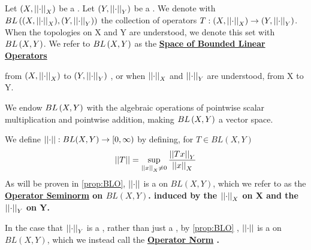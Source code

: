 \label{def:BLO} 
\newcommand{\SpaceOfBoundedLinearOperators}[0]{ 
    \bf \hyperref[def:BLO]{Space of Bounded Linear Operators} \rm
}
\newcommand{\OperatorSeminorm}[0]{
    \bf \hyperref[def:BLO]{Operator Seminorm} \rm
}
\newcommand{\OperatorNorm}[0]{
    \bf \hyperref[def:BLO]{Operator Norm} \rm
}
\begin{df}
Let $(X,\left|\left| \cdot \right|\right|_X)$ be a \NonDegenerate \SeminormedSpace.
Let $(Y, \left|\left| \cdot \right|\right|_Y)$ be a \SeminormedSpace.
We denote with $BL\left( (X,\left|\left| \cdot \right|\right|_X), (Y, \left|\left| \cdot \right|\right|_Y)\right)$ 
the collection of
\Continuous
\Linear
operators
$T:(X, \left|\left| \cdot \right|\right|_X) \to (Y, \left|\left| \cdot \right|\right|_Y)$. 
When the topologies on X and Y are understood, we denote this set with
$BL\left( X,Y\right)$. 
We refer to $BL\left( X,Y\right)$ as the \SpaceOfBoundedLinearOperators 
from $(X, \left|\left| \cdot \right|\right|_X)$ to $(Y, \left|\left| \cdot \right|\right|_Y)$ 
, or when $\left|\left| \cdot \right|\right|_X$ and $\left|\left| \cdot \right|\right|_Y$ are understood, 
from X to Y. 

We endow $BL\left( X,Y\right)$ with the algebraic operations
of pointwise scalar multiplication
and pointwise addition, making $BL\left( X,Y\right)$ a vector space. 

We define $\left|\left| \cdot \right|\right|:BL(X,Y) \to [0,\infty)$ by defining, 
for $T \in BL(X,Y)$
\begin{equation}
    \left|\left| T \right|\right| = \sup\limits_{\left|\left| x \right|\right|_X \neq 0} \frac{\left|\left| Tx \right|\right|_Y}{\left|\left| x \right|\right|_X}
\end{equation}
As will be proven in \ref{prop:BLO}, $\left|\left| \cdot \right|\right|$ is a \Seminorm on $BL(X,Y)$, which 
we refer to as the \OperatorSeminorm on $BL(X,Y)$. induced by the
\Seminorm $\left|\left| \cdot \right|\right|_X$ on X and the \Seminorm $\left|\left| \cdot \right|\right|_Y$ on Y. 

In the case that $\left|\left| \cdot \right|\right|_{Y}$ is a \Norm, rather than just a \Seminorm, by \ref{prop:BLO}
, $\left|\left| \cdot \right|\right|$ is a \Norm on $BL(X,Y)$, which we instead call the \OperatorNorm. 
\end{df}
